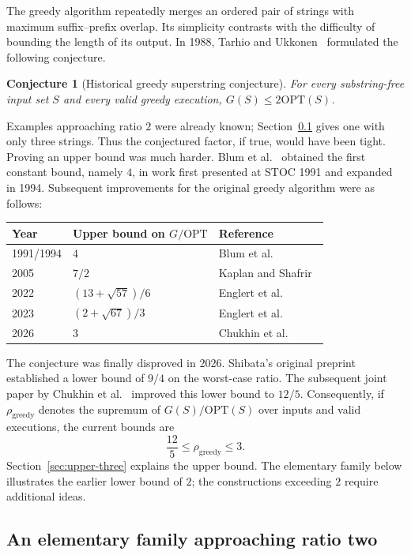 \documentclass[11pt,a4paper]{article}   %
\theoremstyle{compact}
\newtheorem{conjecture}[theorem]{Conjecture}
\theoremstyle{compactdef}
\newcommand{\OPT}{\mathrm{OPT}}
\newcommand{\GR}{G}                         %
\begin{document}
The greedy algorithm repeatedly merges an ordered pair of strings with
maximum suffix--prefix overlap. Its simplicity contrasts with the difficulty
of bounding the length of its output. In 1988, Tarhio and
Ukkonen~\cite{TU88} formulated the following conjecture.

\begin{conjecture}[Historical greedy superstring conjecture]
For every substring-free input set $S$ and every valid greedy execution,
$\GR(S)\le 2\OPT(S)$.
\end{conjecture}

Examples approaching ratio $2$ were already known; Section~\ref{sec:lower-two}
gives one with only three strings. Thus the conjectured factor, if true,
would have been tight. Proving an upper bound was much harder. Blum et
al.~\cite{BJLTY94} obtained the first constant bound, namely $4$, in work
first presented at STOC 1991 and expanded in 1994. Subsequent improvements
for the original greedy algorithm were as follows:
\begin{center}
\begin{tabular}{lll}
\toprule
Year & Upper bound on $\GR/\OPT$ & Reference \\
\midrule
1991/1994 & $4$ & Blum et al.~\cite{BJLTY94} \\
2005 & $7/2$ & Kaplan and Shafrir~\cite{KS05} \\
2022 & $(13+\sqrt{57})/6$ & Englert et al.~\cite{EMV22} \\
2023 & $(2+\sqrt{67})/3$ & Englert et al.~\cite{EMV23} \\
2026 & $3$ & Chukhin et al.~\cite{CKMS26} \\
\bottomrule
\end{tabular}
\end{center}

The conjecture was finally disproved in 2026. Shibata's original
preprint~\cite{Shi26} established a lower bound of $9/4$ on the worst-case
ratio. The subsequent joint paper by Chukhin et al.~\cite{GSC26} improved
this lower bound to $12/5$. Consequently, if $\rho_{\mathrm{greedy}}$
denotes the supremum of $\GR(S)/\OPT(S)$ over inputs and valid executions,
the current bounds are
\[
  \frac{12}{5}\le\rho_{\mathrm{greedy}}\le3.
\]
Section~\ref{sec:upper-three} explains the upper bound. The elementary
family below illustrates the earlier lower bound of $2$; the constructions
exceeding $2$ require additional ideas.

\subsection{An elementary family approaching ratio two}
\label{sec:lower-two}
\end{document}
